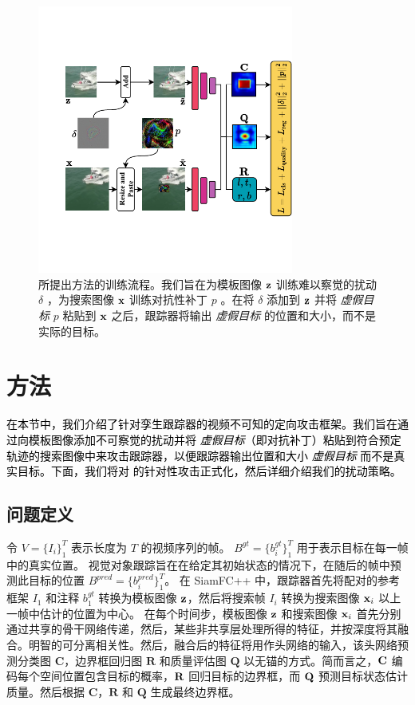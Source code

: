 \begin{figure}[t]
\centering
\includegraphics[width=0.75\textwidth]{Img/attack/network_v5.pdf}
\caption{所提出方法的训练流程。我们旨在为模板图像 $\textbf z$ 训练难以察觉的扰动 $\delta$ ，为搜索图像 $\textbf x$ 训练对抗性补丁 $p$ 。在将 $\delta$ 添加到 $\textbf z$ 并将 \textit{虚假目标} $p$ 粘贴到 $\textbf x$ 之后，跟踪器将输出  \textit{虚假目标} 的位置和大小，而不是实际的目标。}
\label{fig:net}
\end{figure}

\section{方法}

\textcolor{black}{在本节中，我们介绍了针对孪生跟踪器的视频不可知的定向攻击框架。我们旨在通过向模板图像添加不可察觉的扰动并将 \textit{虚假目标}（即对抗补丁）粘贴到符合预定轨迹的搜索图像中来攻击跟踪器，以便跟踪器输出位置和大小 \textit{虚假目标} 而不是真实目标。下面，我们将对 \cite{SiamFC++} 的针对性攻击正式化，然后详细介绍我们的扰动策略。}

\subsection{问题定义}

令 $V=\{I_i\}_1^T$ 表示长度为 $T$ 的视频序列的帧。
$B^{gt}=\{b^{gt}_i\}_1^T$ 用于表示目标在每一帧中的真实位置。
视觉对象跟踪旨在在给定其初始状态的情况下，在随后的帧中预测此目标的位置 $B^{pred}=\{b^{pred}_i\}_1^T$。
在 SiamFC++ 中，跟踪器首先将配对的参考框架 $I_1$ 和注释 $b_1^{gt}$ 转换为模板图像 $\textbf z$，然后将搜索帧 $I_i$ 转换为搜索图像 $\textbf x_i$ 以上一帧中估计的位置为中心。
在每个时间步，模板图像 $\textbf z$ 和搜索图像 $\textbf x_i$ 首先分别通过共享的骨干网络传递，然后，某些非共享层处理所得的特征，并按深度将其融合。明智的可分离相关性。然后，融合后的特征将用作头网络的输入，该头网络预测分类图 $\textbf{C}$，边界框回归图 $\textbf{R}$ 和质量评估图 $\textbf{Q}$ 以无锚的方式。简而言之，$\textbf C$ 编码每个空间位置包含目标的概率，$\textbf R$ 回归目标的边界框，而 $\textbf Q$ 预测目标状态估计质量。然后根据 $\textbf{C}$，$\textbf{R}$ 和 $\textbf{Q}$ 生成最终边界框。

